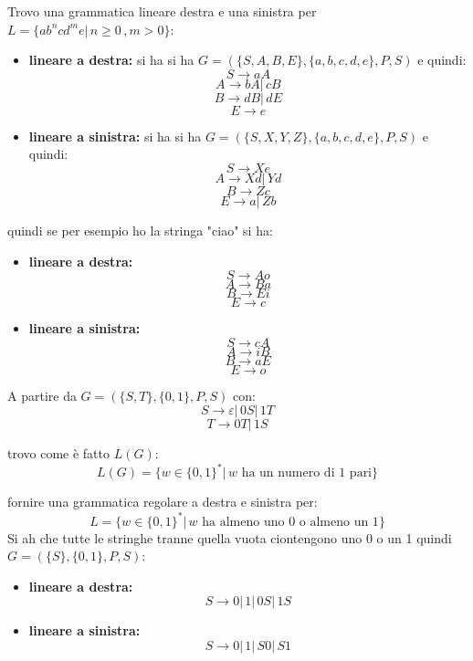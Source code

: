 \documentclass[a4paper,12pt, oneside]{book}
\begin{document}
\begin{esempio}
Trovo una grammatica lineare destra e una sinistra per $L=\{ab^ncd^me|\,n\geq 0\,,m> 0\}$:
\begin{itemize}
\item \textbf{lineare a destra:} si ha  si ha $G=(\{S,A,B,E\},\{a,b,c,d,e\},P,S)$ e quindi:
$$S\to aA$$
$$A\to bA|\,cB$$
$$B\to dB|\, dE$$
$$E\to e$$
\item \textbf{lineare a sinistra:} si ha  si ha $G=(\{S,X,Y,Z\},\{a,b,c,d,e\},P,S)$ e quindi:
$$S\to Xe$$
$$A\to Xd|\,Yd$$
$$B\to Zc$$
$$E\to a|\,Zb$$
\end{itemize}
quindi se per esempio ho la stringa "ciao" si ha:
\begin{itemize}
\item \textbf{lineare a destra:}
$$S\to Ao$$
$$A\to Ba$$
$$B\to Ei$$
$$E\to c$$
\item \textbf{lineare a sinistra:} 
$$S\to cA$$
$$A\to iB$$
$$B\to aE$$
$$E\to o$$
\end{itemize}
\end{esempio}
\begin{esempio}
A partire da $G=(\{S,T\},\{0,1\},P,S)$ con:
$$S\to\varepsilon|\,0S|\,1T$$
$$T\to 0T|\,1S$$

trovo come è fatto $L(G)$:
$$L(G)=\{w\in\{0,1\}^*|\, w \mbox{ ha un numero di 1 pari}\}$$
\end{esempio}
\begin{esempio}
fornire una grammatica regolare a destra e sinistra per:
$$L=\{w\in\{0,1\}^*|\, w \mbox{ ha almeno uno 0 o almeno un 1}\}$$
Si ah che tutte le stringhe tranne quella vuota ciontengono uno 0 o un 1
quindi  $G=(\{S\},\{0,1\},P,S)$:
\begin{itemize}
\item \textbf{lineare a destra:}
$$S\to 0|\,1|\,0S|\,1S$$
\item \textbf{lineare a sinistra:} 
$$S\to 0|\,1|\,S0|\,S1$$
\end{itemize}
\end{esempio}
\end{document}
